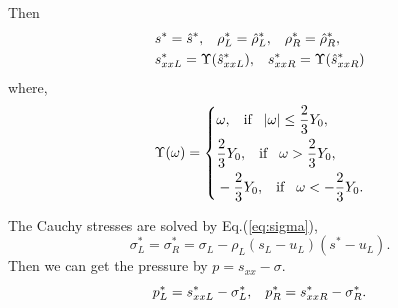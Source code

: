 \documentclass{article}
\numberwithin{equation}{section}
\numberwithin{table}{section}
\begin{document}
Then 
\begin{align}
&  s^* = \hat{s}^*,\hspace{0.3cm} \rho^*_L = \hat{\rho}_L^*, \hspace{0.3cm} \rho_R^* = \hat{\rho}_R^*,\\
&  s_{xxL}^*  = \Upsilon(\hat{s}_{xxL}^*),\hspace{0.3cm} s_{xxR}^*  = \Upsilon(\hat{s}_{xxR}^*)
\end{align}
where,
\begin{equation}\label{eq:upsilon}
  \Upsilon(\omega) = \left\{ \begin{aligned}
	  &\omega, \hspace{0.3cm} \text{if} \hspace{0.3cm} |\omega| \le \frac{2}{3}Y_0,\\
	  &\frac{2}{3}Y_0,  \hspace{0.3cm} \text{if} \hspace{0.3cm} \omega > \frac{2}{3}Y_0,\\
	 &-\frac{2}{3}Y_0,  \hspace{0.3cm} \text{if} \hspace{0.3cm} \omega < -\frac{2}{3}Y_0.\\
 \end{aligned}\right.
 \end{equation}

 The Cauchy stresses are solved  by Eq.(\ref{eq:sigma}), 
\begin{equation*}
  \sigma_L^*=\sigma_R^*=\sigma_L -\rho_L (s_L-u_L)(s^*-u_L).
\end{equation*}
 Then we can get the pressure by $p =s_{xx}-\sigma$.
\begin{equation}
  p_L^* = s_{xxL}^* - \sigma_L^*, \hspace{0.3cm}   p_R^* = s_{xxR}^* - \sigma_R^*.
\end{equation}
\end{document}
